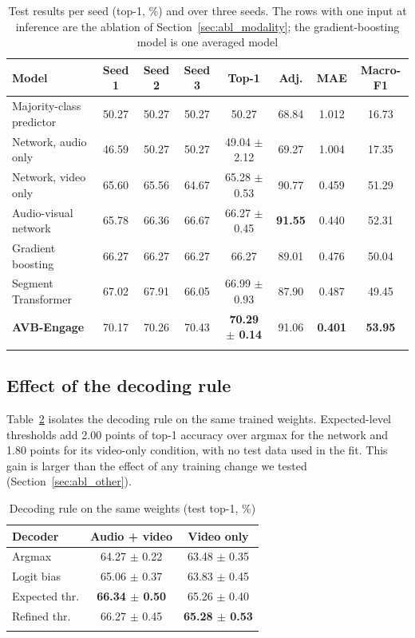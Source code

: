 \documentclass[pdflatex,iicol,sn-basic]{sn-jnl}
\newcommand{\ournet}{AVB-Engage}
\begin{document}
\begin{table}[t]
\caption{Test results per seed (top-1, \%) and over three seeds. The rows with one input at inference are the ablation of Section~\ref{sec:abl_modality}; the gradient-boosting model is one averaged model}\label{tab:seeds}
\begin{tabular*}{\textwidth}{@{\extracolsep\fill}lccccccc}
\toprule
Model & Seed 1 & Seed 2 & Seed 3 & Top-1 & Adj. & MAE & Macro-F1\\
\midrule
Majority-class predictor & 50.27 & 50.27 & 50.27 & 50.27 & 68.84 & 1.012 & 16.73\\
Network, audio only & 46.59 & 50.27 & 50.27 & 49.04 $\pm$ 2.12 & 69.27 & 1.004 & 17.35\\
Network, video only & 65.60 & 65.56 & 64.67 & 65.28 $\pm$ 0.53 & 90.77 & 0.459 & 51.29\\
Audio-visual network & 65.78 & 66.36 & 66.67 & 66.27 $\pm$ 0.45 & \textbf{91.55} & 0.440 & 52.31\\
Gradient boosting & 66.27 & 66.27 & 66.27 & 66.27 & 89.01 & 0.476 & 50.04\\
Segment Transformer & 67.02 & 67.91 & 66.05 & 66.99 $\pm$ 0.93 & 87.90 & 0.487 & 49.45\\
\textbf{\ournet} & 70.17 & 70.26 & 70.43 & \textbf{70.29 $\pm$ 0.14} & 91.06 & \textbf{0.401} & \textbf{53.95}\\
\botrule
\end{tabular*}
\end{table}

\subsection{Effect of the decoding rule}\label{sec:res_decoder}

Table~\ref{tab:decoder} isolates the decoding rule on the same trained weights. Expected-level thresholds add 2.00 points of top-1 accuracy over argmax for the network and 1.80 points for its video-only condition, with no test data used in the fit. This gain is larger than the effect of any training change we tested (Section~\ref{sec:abl_other}).

\begin{table}[t]
\caption{Decoding rule on the same weights (test top-1, \%)}\label{tab:decoder}
\begin{tabular*}{\columnwidth}{@{\extracolsep\fill}lcc}
\toprule
Decoder & Audio + video & Video only\\
\midrule
Argmax & 64.27 $\pm$ 0.22 & 63.48 $\pm$ 0.35\\
Logit bias & 65.06 $\pm$ 0.37 & 63.83 $\pm$ 0.45\\
Expected thr. & \textbf{66.34 $\pm$ 0.50} & 65.26 $\pm$ 0.40\\
Refined thr. & 66.27 $\pm$ 0.45 & \textbf{65.28 $\pm$ 0.53}\\
\botrule
\end{tabular*}
\end{table}
\end{document}
